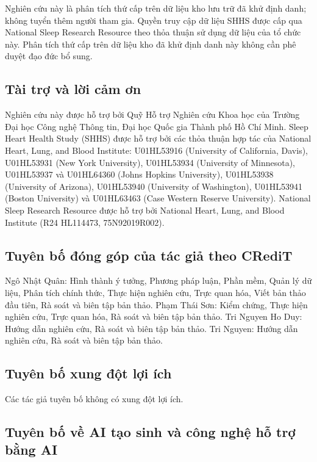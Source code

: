 \documentclass[11pt,a4paper]{article}
\begin{document}
Nghiên cứu này là phân tích thứ cấp trên dữ liệu kho lưu trữ đã khử định danh; không tuyển thêm người tham
gia. Quyền truy cập dữ liệu SHHS được cấp qua National Sleep Research Resource theo thỏa thuận sử dụng dữ liệu
của tổ chức này. Phân tích thứ cấp trên dữ liệu kho đã khử định danh này không cần phê duyệt đạo đức bổ sung.

\subsection*{Tài trợ và lời cảm ơn}

Nghiên cứu này được hỗ trợ bởi Quỹ Hỗ trợ Nghiên cứu Khoa học của Trường Đại học Công nghệ Thông tin, Đại học
Quốc gia Thành phố Hồ Chí Minh. Sleep Heart Health Study (SHHS) được hỗ trợ bởi các thỏa thuận hợp tác của National Heart, Lung, and Blood
Institute: U01HL53916 (University of California, Davis), U01HL53931 (New York University), U01HL53934
(University of Minnesota), U01HL53937 và U01HL64360 (Johns Hopkins University), U01HL53938 (University of
Arizona), U01HL53940 (University of Washington), U01HL53941 (Boston University) và U01HL63463 (Case Western
Reserve University). National Sleep Research Resource được hỗ trợ bởi National Heart, Lung, and Blood
Institute (R24 HL114473, 75N92019R002).

\subsection*{Tuyên bố đóng góp của tác giả theo CRediT}

Ngô Nhật Quân: Hình thành ý tưởng, Phương pháp luận, Phần mềm, Quản lý dữ liệu, Phân tích chính thức, Thực hiện
nghiên cứu, Trực quan hóa, Viết bản thảo đầu tiên, Rà soát và biên tập bản thảo. Phạm Thái Sơn: Kiểm chứng,
Thực hiện nghiên cứu, Trực quan hóa, Rà soát và biên tập bản thảo. Tri Nguyen Ho Duy: Hướng dẫn nghiên cứu, Rà
soát và biên tập bản thảo. Tri Nguyen: Hướng dẫn nghiên cứu, Rà soát và biên tập bản thảo.

\subsection*{Tuyên bố xung đột lợi ích}

Các tác giả tuyên bố không có xung đột lợi ích.

\subsection*{Tuyên bố về AI tạo sinh và công nghệ hỗ trợ bằng AI}
\end{document}
